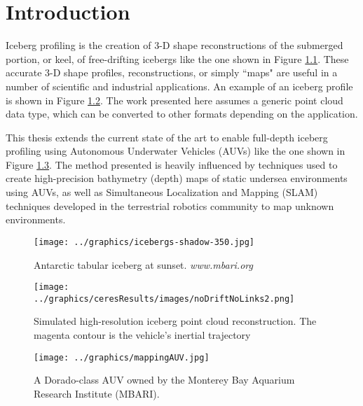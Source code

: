 
\chapter{Introduction}
\label{ch.Introduction}

Iceberg profiling is the creation of 3-D shape reconstructions of the submerged portion, or keel, of free-drifting icebergs like the one shown in Figure \ref{fig:IcebergSunset}. These accurate 3-D shape profiles, reconstructions, or simply ``maps" are useful in a number of scientific and industrial applications. An example of an iceberg profile is shown in Figure \ref{fig:idealMap}. The work presented here assumes a generic point cloud data type, which can be converted to other formats depending on the application.

This thesis extends the current state of the art to enable full-depth iceberg profiling using Autonomous Underwater Vehicles (AUVs) like the one shown in Figure \ref{fig:AUVdorado1}. The method presented is heavily influenced by techniques used to create high-precision bathymetry (depth) maps of static undersea environments using AUVs, as well as Simultaneous Localization and Mapping (SLAM) techniques developed in the terrestrial robotics community to map unknown environments.

\begin{figure}[!htb]
   \centering
   \texttt{[image: ../graphics/icebergs-shadow-350.jpg]} %
   \caption{Antarctic tabular iceberg at sunset. \emph{www.mbari.org}}
   \label{fig:IcebergSunset}
\end{figure}

\begin{figure}[!htb]
   \centering
   \texttt{[image: ../graphics/ceresResults/images/noDriftNoLinks2.png]} %
   \caption{Simulated high-resolution iceberg point cloud reconstruction. The magenta contour is the vehicle's inertial trajectory}
   \label{fig:idealMap}
\end{figure}

\begin{figure}[htb]
   \centering
   \texttt{[image: ../graphics/mappingAUV.jpg]} %
   \caption{A Dorado-class AUV owned by the Monterey Bay Aquarium Research Institute (MBARI).}
   \label{fig:AUVdorado1}
\end{figure}

